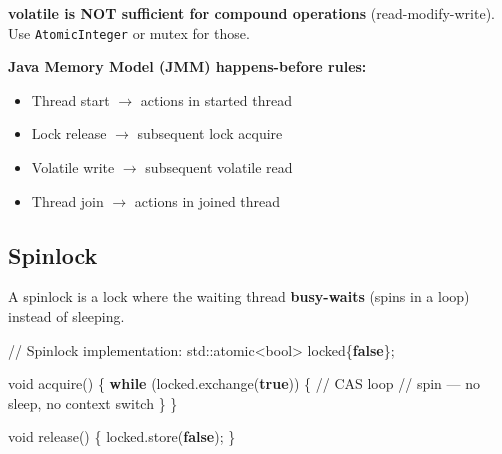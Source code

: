 \documentclass[11pt]{article}
\providecommand{\tightlist}{\setlength{\itemsep}{1pt}\setlength{\parskip}{0pt}}
\newenvironment{Shaded}{\begin{snugshade}}{\end{snugshade}}
\newcommand{\BuiltInTok}[1]{\textcolor[rgb]{0.50,0.55,0.55}{#1}}
\newcommand{\CommentTok}[1]{\textcolor[rgb]{0.48,0.49,0.49}{#1}}
\newcommand{\ControlFlowTok}[1]{\textcolor[rgb]{0.99,0.74,0.29}{\textbf{#1}}}
\newcommand{\DataTypeTok}[1]{\textcolor[rgb]{0.16,0.50,0.73}{#1}}
\newcommand{\KeywordTok}[1]{\textcolor[rgb]{0.81,0.81,0.76}{\textbf{#1}}}
\newcommand{\NormalTok}[1]{\textcolor[rgb]{0.81,0.81,0.76}{#1}}
\newcommand{\OperatorTok}[1]{\textcolor[rgb]{0.81,0.81,0.76}{#1}}
\begin{document}
\textbf{volatile is NOT sufficient for compound operations} (read-modify-write). Use \texttt{AtomicInteger} or mutex for those.

\textbf{Java Memory Model (JMM) happens-before rules:}

\begin{itemize}
\tightlist
\item
  Thread start \(\rightarrow\) actions in started thread
\item
  Lock release \(\rightarrow\) subsequent lock acquire
\item
  Volatile write \(\rightarrow\) subsequent volatile read
\item
  Thread join \(\rightarrow\) actions in joined thread
\end{itemize}

\subsection{Spinlock}\label{spinlock}

A spinlock is a lock where the waiting thread \textbf{busy-waits} (spins in a loop) instead of sleeping.


\begin{Shaded}
\begin{Highlighting}[]
\CommentTok{// Spinlock implementation:}
\BuiltInTok{std::}\NormalTok{atomic}\OperatorTok{\textless{}}\DataTypeTok{bool}\OperatorTok{\textgreater{}}\NormalTok{ locked}\OperatorTok{\{}\KeywordTok{false}\OperatorTok{\};}

\DataTypeTok{void}\NormalTok{ acquire}\OperatorTok{()} \OperatorTok{\{}
    \ControlFlowTok{while} \OperatorTok{(}\NormalTok{locked}\OperatorTok{.}\NormalTok{exchange}\OperatorTok{(}\KeywordTok{true}\OperatorTok{))} \OperatorTok{\{}  \CommentTok{// CAS loop}
        \CommentTok{// spin — no sleep, no context switch}
    \OperatorTok{\}}
\OperatorTok{\}}

\DataTypeTok{void}\NormalTok{ release}\OperatorTok{()} \OperatorTok{\{}
\NormalTok{    locked}\OperatorTok{.}\NormalTok{store}\OperatorTok{(}\KeywordTok{false}\OperatorTok{);}
\OperatorTok{\}}
\end{Highlighting}
\end{Shaded}
\end{document}
